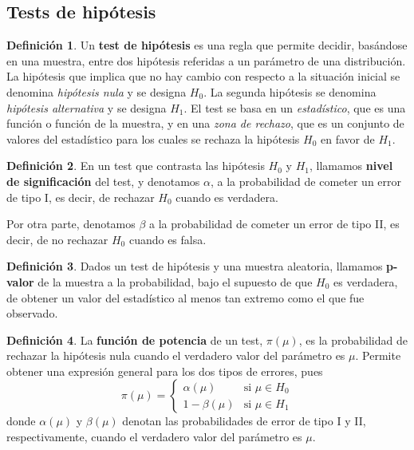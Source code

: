 \documentclass[11pt]{article}
\theoremstyle{plain}
\theoremstyle{definition}
\newtheorem*{defi}{Definición}
\theoremstyle{remark}
\newcommand{\deft}[1]{\textbf{#1}}  %
\begin{document}
  \subsection{Tests de hipótesis}

    \begin{defi}
      Un \deft{test de hipótesis} es una regla que permite decidir, basándose en una muestra, entre dos hipótesis referidas a un parámetro de una distribución. La hipótesis que implica que no hay cambio con respecto a la situación inicial se denomina \emph{hipótesis nula} y se designa $H_0$. La segunda hipótesis se denomina \emph{hipótesis alternativa} y se designa $H_1$.
      El test se basa en un \emph{estadístico}, que es una función o función de la muestra, y en una \emph{zona de rechazo}, que es un conjunto de valores del estadístico para los cuales se rechaza la hipótesis $H_0$ en favor de $H_1$.
    \end{defi}

    \begin{defi}
      En un test que contrasta las hipótesis $H_0$ y $H_1$, llamamos \deft{nivel de significación} del test, y denotamos $\alpha$, a la probabilidad de cometer un error de tipo I, es decir, de rechazar $H_0$ cuando es verdadera.

      Por otra parte, denotamos $\beta$ a la probabilidad de cometer un error de tipo II, es decir, de no rechazar $H_0$ cuando es falsa.
    \end{defi}

    \begin{defi}
      Dados un test de hipótesis y una muestra aleatoria, llamamos \deft{p-valor} de la muestra a la probabilidad, bajo el supuesto de que $H_0$ es verdadera, de obtener un valor del estadístico al menos tan extremo como el que fue observado.
    \end{defi}

    \begin{defi}
      La \deft{función de potencia} de un test, $\pi(\mu)$, es la probabilidad de rechazar la hipótesis nula cuando el verdadero valor del parámetro es $\mu$. Permite obtener una expresión general para los dos tipos de errores, pues
      \[ \pi(\mu) = \begin{cases}
      \alpha(\mu) & \text{si $\mu \in H_0$} \\
      1 - \beta(\mu) & \text{si $\mu \in H_1$}
      \end{cases} \]
      donde $\alpha(\mu)$ y $\beta(\mu)$ denotan las probabilidades de error de tipo I y II, respectivamente, cuando el verdadero valor del parámetro es $\mu$.
    \end{defi}
\end{document}
